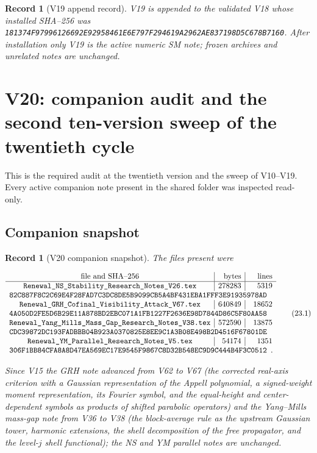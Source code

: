 \documentclass[11pt]{article}
\newtheorem{record}[theorem]{Record}
\theoremstyle{remark}
\begin{document}
\begin{record}[V19 append record]
\label{rec:v20v19}
V19 is appended to the validated V18 whose installed SHA--256 was
\texttt{181374F97996126692E92958461E6E797F294619A2962AE837198D5C678B7160}.
After installation only V19 is the active numeric SM note; frozen
archives and unrelated notes are unchanged.
\end{record}


\section{V20: companion audit and the second ten-version sweep of the twentieth cycle}
\label{sec:v20v20}

This is the required audit at the twentieth version and the sweep of
V10--V19.  Every active companion note present in the shared folder
was inspected read-only.

\subsection{Companion snapshot}

\begin{record}[V20 companion snapshot]
\label{rec:v20v20-snapshot}
The files present were

\[
\begin{array}{c|r|r}
\hbox{file and SHA--256}&\hbox{bytes}&\hbox{lines}\\ \hline
\texttt{Renewal\_NS\_Stability\_Research\_Notes\_V26.tex}
&278283&5319\\
\multicolumn{3}{l}{
\texttt{82C887F8C2C69E4F28FAD7C3DC8DE5B9099CB5A4BF431EBA1FFF3E91935978AD}}
\\
\texttt{Renewal\_GRH\_Cofinal\_Visibility\_Attack\_V67.tex}
&640849&18652\\
\multicolumn{3}{l}{
\texttt{4A050D2FE5D6B29E11A878BD2EBC071A1FB1227F2636E98D7844D86C5F80AA58}}
\\
\texttt{Renewal\_Yang\_Mills\_Mass\_Gap\_Research\_Notes\_V38.tex}
&572590&13875\\
\multicolumn{3}{l}{
\texttt{CDC39872DC193FADBBB04B923A0370825E8EE9C1A3B08E498B2D4516F67801DE}}
\\
\texttt{Renewal\_YM\_Parallel\_Research\_Notes\_V5.tex}
&54174&1351\\
\multicolumn{3}{l}{
\texttt{306F1BB84CFA8A8D47EA569EC17E9545F9867C8D32B548EC9D9C444B4F3C0512}}.
\end{array}                                                     \tag{23.1}
\]

Since V15 the GRH note advanced from V62 to V67 (the corrected
real-axis criterion with a Gaussian representation of the Appell
polynomial, a signed-weight moment representation, its Fourier
symbol, and the equal-height and center-dependent symbols as
products of shifted parabolic operators) and the Yang--Mills mass-gap
note from V36 to V38 (the block-average rule as the upstream
Gaussian tower, harmonic extensions, the shell decomposition of the
free propagator, and the level-\(j\) shell functional); the NS and YM
parallel notes are unchanged.
\end{record}
\end{document}
